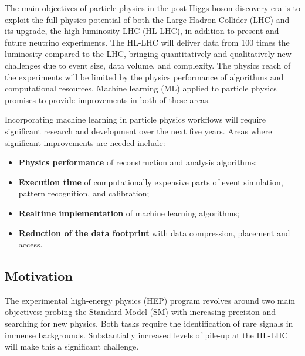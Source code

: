 

The main objectives of particle physics in the post-Higgs boson discovery era is to exploit the full physics potential of both the Large Hadron Collider (LHC) and its upgrade, the high luminosity LHC (HL-LHC), in addition to present and future neutrino experiments.
The HL-LHC will deliver data from 100 times the luminosity compared to the LHC, bringing quantitatively and qualitatively new challenges due to event size, data volume, and complexity. The physics reach of the experiments will be limited by the physics performance of algorithms and computational resources. Machine learning (ML) applied to particle physics promises to provide improvements in both of these areas.

Incorporating machine learning in particle physics workflows will require significant research and development over the next five years. Areas where significant improvements are needed include:
\begin{itemize}
 \item \textbf{Physics performance} of reconstruction and analysis algorithms;
 \item \textbf{Execution time} of computationally expensive parts of event simulation, pattern recognition, and calibration;
 \item \textbf{Realtime implementation} of machine learning algorithms;
 \item \textbf{Reduction of the data footprint} with data compression, placement and access.
\end{itemize}
\noindent

\subsection{Motivation}
The experimental high-energy physics (HEP) program revolves around two main objectives: probing the Standard Model (SM) with increasing precision and searching for new physics. Both tasks require the identification of rare signals in immense backgrounds. Substantially increased levels of pile-up at the HL-LHC will make this a significant challenge.


